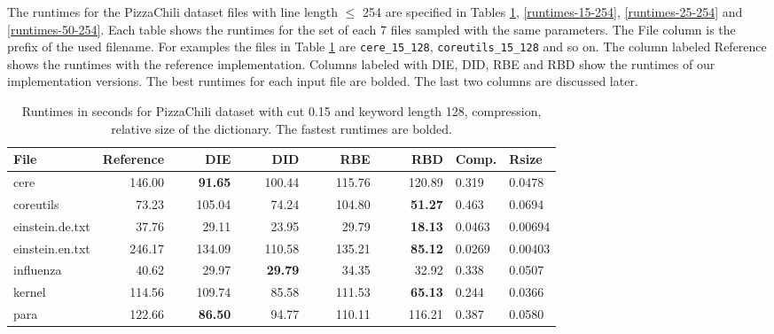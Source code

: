 \documentclass[english,twoside,censored,csm,algorithms-track-2020]{HYthesisML}
\theoremstyle{plain}
\theoremstyle{definition}
\numberwithin{testexample}{chapter}
\begin{document}
The runtimes for the PizzaChili dataset files with line length $\leq$ 254 are specified in
Tables \ref{runtimes-15-128},
\ref{runtimes-15-254}, \ref{runtimes-25-254} and \ref{runtimes-50-254}. Each table shows the
runtimes for the set of each 7 files sampled with the same parameters. The File column is the
prefix of the used filename. For examples the files in Table \ref{runtimes-15-128} are
\texttt{cere\_15\_128}, \texttt{coreutils\_15\_128} and so on. The column labeled Reference shows
the runtimes with the reference implementation. Columns labeled with DIE, DID, RBE and RBD show the
runtimes of our implementation versions. The best runtimes for each input file are bolded.
The last two columns are discussed later.

\begin{center}
  \begin{table}
  \begin{tabular} {| l |r r r r r|l l|}
    \hline
    \textbf{File} & \textbf{Reference} & ~~~~\textbf{DIE} & ~~~~\textbf{DID} & ~~~~\textbf{RBE} & ~~~~\textbf{RBD} & \textbf{Comp.} & \textbf{Rsize} \\
    \hline
    cere & 146.00 & \textbf{91.65} & 100.44 & 115.76 & 120.89            & 0.319  & 0.0478  \\
    coreutils & 73.23 & 105.04 & 74.24 & 104.80 & \textbf{51.27}         & 0.463  & 0.0694  \\
    einstein.de.txt & 37.76 & 29.11 & 23.95 & 29.79 & \textbf{18.13}     & 0.0463 & 0.00694 \\
    einstein.en.txt & 246.17 & 134.09 & 110.58 & 135.21 & \textbf{85.12} & 0.0269 & 0.00403 \\
    influenza & 40.62 & 29.97 & \textbf{29.79} & 34.35 & 32.92           & 0.338  & 0.0507  \\
    kernel & 114.56 & 109.74 & 85.58 & 111.53 & \textbf{65.13}           & 0.244  & 0.0366  \\
    para & 122.66 & \textbf{86.50} & 94.77 & 110.11 & 116.21             & 0.387  & 0.0580  \\
    \hline
  \end{tabular}
  \caption{Runtimes in seconds for PizzaChili dataset with cut 0.15 and keyword length 128, compression, relative size of the dictionary. The fastest runtimes are bolded.}
  \label{runtimes-15-128}
  \end{table}
\end{center}
\end{document}
